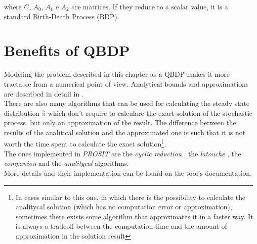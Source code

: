 where \( C \), \( A_{0} \), \( A_{1} \) e \( A_{2} \) are matrices. If they reduce to a scalar value, it is a standard Birth-Death Process (BDP).

\section{Benefits of QBDP}
Modeling the problem described in this chapter as a QBDP makes it more tractable from a numerical point of view. Analytical bounds and approximations are described in detail in \cite{probGuarantees}.\\
There are also many algorithms that can be used for calculating the steady state distribution \( \overset{\sim}{\pi} \) which don't require to calculare the exact solution of the stochastic process, but only an approximation of the result. The difference between the results of the analitical solution and the approximated one is such that it is not worth the time spent to calculate the exact solution\footnote{In cases similar to this one, in which there is the possibility to calculate the analitycal solution (which has no computation error or approximation), sometimes there exists some algorithm that approximates it in a faster way. It is always a tradeoff between the computation time and the amount of approximation in the solution result}.\\
The ones implemented in \emph{PROSIT} are the \emph{cyclic reduction} \cite{cyclic}, the \emph{latouche} \cite{latouche}, the \emph{companion} \cite{probGuarantees} and the \emph{analitycal} \cite{probGuarantees} algorithms.\\
More details and their implementation can be found on the tool's documentation.